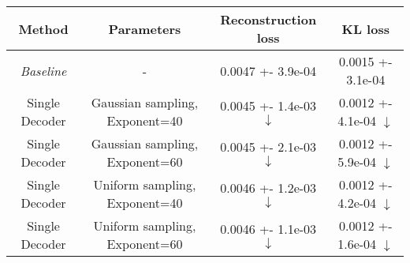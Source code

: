 \centering
\scriptsize
\begin{tabular}{||c|c|c|c||}
\hline
 Method & Parameters & Reconstruction loss & KL loss \\
\hline
\textit{Baseline} & - & 0.0047 +- 3.9e-04 & 0.0015 +- 3.1e-04 \\
\hline
Single Decoder & Gaussian sampling, Exponent=40 & 0.0045 +- 1.4e-03  $\downarrow$ & 0.0012 +- 4.1e-04  $\downarrow$ \\
\hline
Single Decoder & Gaussian sampling, Exponent=60 & 0.0045 +- 2.1e-03  $\downarrow$ & 0.0012 +- 5.9e-04  $\downarrow$ \\
\hline
Single Decoder & Uniform sampling, Exponent=40 & 0.0046 +- 1.2e-03  $\downarrow$ & 0.0012 +- 4.2e-04  $\downarrow$ \\
\hline
Single Decoder & Uniform sampling, Exponent=60 & 0.0046 +- 1.1e-03  $\downarrow$ & 0.0012 +- 1.6e-04  $\downarrow$ \\
\hline
\end{tabular}
